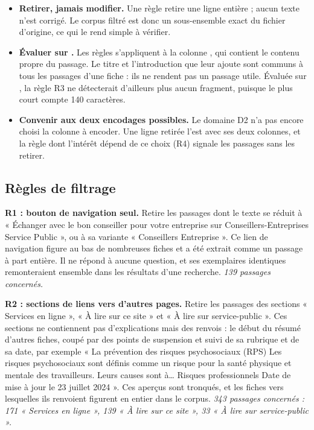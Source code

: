 \begin{itemize}
\item \textbf{Retirer, jamais modifier.} Une règle retire une ligne entière ; aucun texte n'est
corrigé. Le corpus filtré est donc un sous-ensemble exact du fichier d'origine, ce qui le rend simple à
vérifier.
\item \textbf{Évaluer sur .} Les règles s'appliquent à la colonne , qui contient
le contenu propre du passage. Le titre et l'introduction que  leur ajoute sont communs
à tous les passages d'une fiche : ils ne rendent pas un passage utile. Évaluée sur , la
règle R3 ne détecterait d'ailleurs plus aucun fragment, puisque le plus court  compte
140 caractères.
\item \textbf{Convenir aux deux encodages possibles.} Le domaine D2 n'a pas encore choisi la colonne à
encoder. Une ligne retirée l'est avec ses deux colonnes, et la règle dont l'intérêt dépend de ce choix
(R4) signale les passages sans les retirer.
\end{itemize}

\subsection{Règles de filtrage}

\textbf{R1 : bouton de navigation seul.} Retire les passages dont le texte se réduit à « Échanger avec le
bon conseiller pour votre entreprise sur Conseillers-Entreprises Service Public », ou à sa variante
« Conseillers Entreprise ». Ce lien de navigation figure au bas de nombreuses fiches et a été extrait
comme un passage à part entière. Il ne répond à aucune question, et ses exemplaires identiques
remonteraient ensemble dans les résultats d'une recherche. \emph{139 passages concernés.}

\textbf{R2 : sections de liens vers d'autres pages.} Retire les passages des sections « Services en
ligne », « À lire sur ce site » et « À lire sur service-public ». Ces sections ne contiennent pas
d'explications mais des renvois : le début du résumé d'autres fiches, coupé par des points de
suspension et suivi de sa rubrique et de sa date, par exemple « La prévention des risques psychosociaux
(RPS) Les risques psychosociaux sont définis comme un risque pour la santé physique et mentale des
travailleurs. Leurs causes sont à\dots{} Risques professionnels Date de mise à jour le 23 juillet 2024 ».
Ces aperçus sont tronqués, et les fiches vers lesquelles ils renvoient figurent en entier dans le corpus.
\emph{343 passages concernés : 171 « Services en ligne », 139 « À lire sur ce site », 33 « À lire sur
service-public ».}

